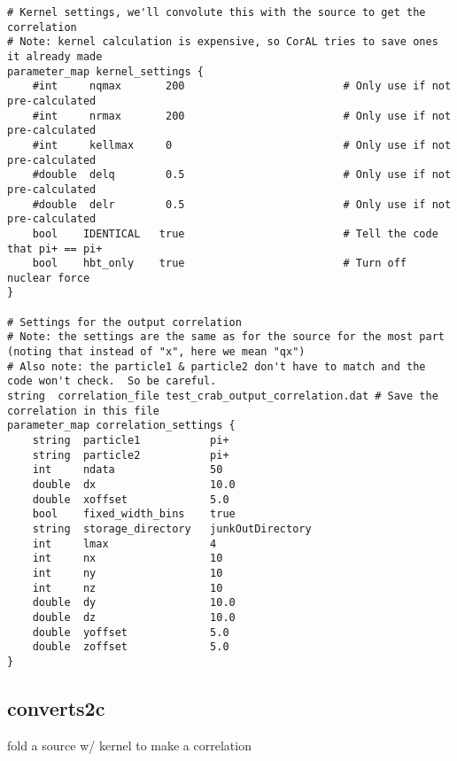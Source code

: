 \documentclass[10pt]{article}
\begin{document}
\begin{verbatim}
# Kernel settings, we'll convolute this with the source to get the correlation
# Note: kernel calculation is expensive, so CorAL tries to save ones it already made
parameter_map kernel_settings {
    #int     nqmax       200                         # Only use if not pre-calculated
    #int     nrmax       200                         # Only use if not pre-calculated
    #int     kellmax     0                           # Only use if not pre-calculated
    #double  delq        0.5                         # Only use if not pre-calculated
    #double  delr        0.5                         # Only use if not pre-calculated
    bool    IDENTICAL   true                         # Tell the code that pi+ == pi+
    bool    hbt_only    true                         # Turn off nuclear force
}

# Settings for the output correlation
# Note: the settings are the same as for the source for the most part (noting that instead of "x", here we mean "qx")
# Also note: the particle1 & particle2 don't have to match and the code won't check.  So be careful.
string  correlation_file test_crab_output_correlation.dat # Save the correlation in this file
parameter_map correlation_settings {
    string  particle1           pi+                  
    string  particle2           pi+                  
    int     ndata               50
    double  dx                  10.0
    double  xoffset             5.0
    bool    fixed_width_bins    true
    string  storage_directory   junkOutDirectory
    int     lmax                4
    int     nx                  10
    int     ny                  10
    int     nz                  10
    double  dy                  10.0
    double  dz                  10.0
    double  yoffset             5.0
    double  zoffset             5.0
}
\end{verbatim}


\subsection{converts2c}
fold a source w/ kernel to make a correlation
\end{document}
